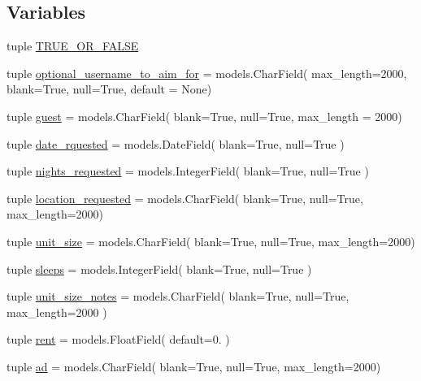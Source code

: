 \subsection*{Variables}
\begin{DoxyCompactItemize}
\item 
tuple \hyperlink{namespaceguest__reservation__manager_1_1models_aa33338a7c5e0f3ec940572c2d8edc30d}{T\-R\-U\-E\-\_\-\-O\-R\-\_\-\-F\-A\-L\-S\-E}
\item 
tuple \hyperlink{namespaceguest__reservation__manager_1_1models_a1d499a99f73d12d35190ca4c8283a401}{optional\-\_\-username\-\_\-to\-\_\-aim\-\_\-for} = models.\-Char\-Field( max\-\_\-length=2000, blank=True, null=True, default = None)
\item 
tuple \hyperlink{namespaceguest__reservation__manager_1_1models_a0518066413c1ffe905fa0f536de22dce}{guest} = models.\-Char\-Field( blank=True, null=True, max\-\_\-length = 2000)
\item 
tuple \hyperlink{namespaceguest__reservation__manager_1_1models_a3c1ebd1cf4a68a2a43143419ff894da0}{date\-\_\-rquested} = models.\-Date\-Field( blank=True, null=True )
\item 
tuple \hyperlink{namespaceguest__reservation__manager_1_1models_ab93ac6c64d7f9a4c94e54b406feb4081}{nights\-\_\-requested} = models.\-Integer\-Field( blank=True, null=True )
\item 
tuple \hyperlink{namespaceguest__reservation__manager_1_1models_a5c5ee49f53b737443ad2b5089427d726}{location\-\_\-requested} = models.\-Char\-Field( blank=True, null=True, max\-\_\-length=2000)
\item 
tuple \hyperlink{namespaceguest__reservation__manager_1_1models_aa7ae6160b6e1afcef6f17094a6b97c9f}{unit\-\_\-size} = models.\-Char\-Field( blank=True, null=True, max\-\_\-length=2000)
\item 
tuple \hyperlink{namespaceguest__reservation__manager_1_1models_a8c56ef9f51045d16c6b165422c1fdc1d}{sleeps} = models.\-Integer\-Field( blank=True, null=True )
\item 
tuple \hyperlink{namespaceguest__reservation__manager_1_1models_ad7e520f1de790daa090b5c47daf1f386}{unit\-\_\-size\-\_\-notes} = models.\-Char\-Field( blank=True, null=True, max\-\_\-length=2000 )
\item 
tuple \hyperlink{namespaceguest__reservation__manager_1_1models_a06ce0b97c0b006fb2b9a1508b8f07627}{rent} = models.\-Float\-Field( default=0. )
\item 
tuple \hyperlink{namespaceguest__reservation__manager_1_1models_ae578a5fcbdb992cc256f43f9e97c66b5}{ad} = models.\-Char\-Field( blank=True, null=True, max\-\_\-length=2000)

\end{DoxyCompactItemize}
